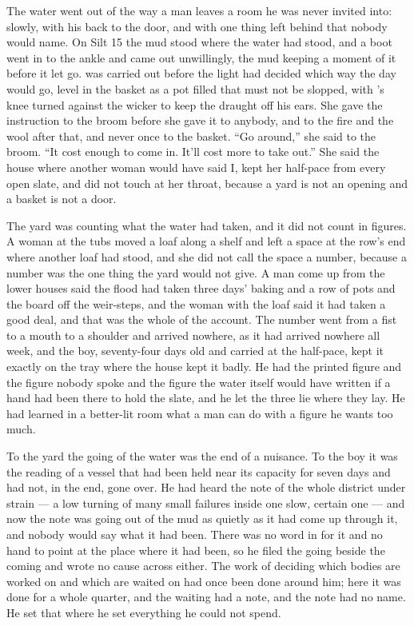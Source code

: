 
The water went out of  the way a man leaves a room he was never invited into: slowly, with his back to the door, and with one thing left behind that nobody would name. On Silt 15 the mud stood where the water had stood, and a boot went in to the ankle and came out unwillingly, the mud keeping a moment of it before it let go.  was carried out before the light had decided which way the day would go, level in the basket as a pot filled that must not be slopped, with 's knee turned against the wicker to keep the draught off his ears. She gave the instruction to the broom before she gave it to anybody, and to the fire and the wool after that, and never once to the basket. “Go around,” she said to the broom. “It cost enough to come in. It'll cost more to take out.” She said the house where another woman would have said I, kept her half-pace from every open slate, and did not touch  at her throat, because a yard is not an opening and a basket is not a door.

The yard was counting what the water had taken, and it did not count in figures. A woman at the tubs moved a loaf along a shelf and left a space at the row's end where another loaf had stood, and she did not call the space a number, because a number was the one thing the yard would not give. A man come up from the lower houses said the flood had taken three days' baking and a row of pots and the board off the weir-steps, and the woman with the loaf said it had taken a good deal, and that was the whole of the account. The number went from a fist to a mouth to a shoulder and arrived nowhere, as it had arrived nowhere all week, and the boy, seventy-four days old and carried at the half-pace, kept it exactly on the tray where the house kept it badly. He had the printed figure and the figure nobody spoke and the figure the water itself would have written if a hand had been there to hold the slate, and he let the three lie where they lay. He had learned in a better-lit room what a man can do with a figure he wants too much.

To the yard the going of the water was the end of a nuisance. To the boy it was the reading of a vessel that had been held near its capacity for seven days and had not, in the end, gone over. He had heard the note of the whole district under strain --- a low turning of many small failures inside one slow, certain one --- and now the note was going out of the mud as quietly as it had come up through it, and nobody would say what it had been. There was no word in  for it and no hand to point at the place where it had been, so he filed the going beside the coming and wrote no cause across either. The work of deciding which bodies are worked on and which are waited on had once been done around him; here it was done for a whole quarter, and the waiting had a note, and the note had no name. He set that where he set everything he could not spend.

